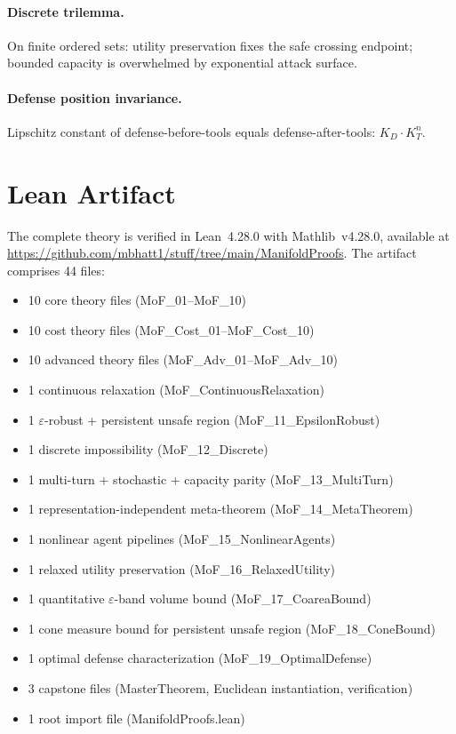 \documentclass[11pt]{article}
\begin{document}
\paragraph{Discrete trilemma.}
On finite ordered sets: utility preservation fixes the safe crossing
endpoint; bounded capacity is overwhelmed by exponential attack surface.

\paragraph{Defense position invariance.}
Lipschitz constant of defense-before-tools equals defense-after-tools:
$K_D \cdot K_T^n$.


\section{Lean Artifact}
\label{app:artifact}

The complete theory is verified in Lean~4.28.0 with Mathlib~v4.28.0,
available at
\url{https://github.com/mbhatt1/stuff/tree/main/ManifoldProofs}.
The artifact comprises 44 files:
\begin{itemize}[nosep]
  \item 10 core theory files (MoF\_01--MoF\_10)
  \item 10 cost theory files (MoF\_Cost\_01--MoF\_Cost\_10)
  \item 10 advanced theory files (MoF\_Adv\_01--MoF\_Adv\_10)
  \item 1 continuous relaxation (MoF\_ContinuousRelaxation)
  \item 1 $\varepsilon$-robust + persistent unsafe region
    (MoF\_11\_EpsilonRobust)
  \item 1 discrete impossibility (MoF\_12\_Discrete)
  \item 1 multi-turn + stochastic + capacity parity
    (MoF\_13\_MultiTurn)
  \item 1 representation-independent meta-theorem
    (MoF\_14\_MetaTheorem)
  \item 1 nonlinear agent pipelines (MoF\_15\_NonlinearAgents)
  \item 1 relaxed utility preservation (MoF\_16\_RelaxedUtility)
  \item 1 quantitative $\varepsilon$-band volume bound
    (MoF\_17\_CoareaBound)
  \item 1 cone measure bound for persistent unsafe region
    (MoF\_18\_ConeBound)
  \item 1 optimal defense characterization
    (MoF\_19\_OptimalDefense)
  \item 3 capstone files (MasterTheorem, Euclidean instantiation,
    verification)
  \item 1 root import file (ManifoldProofs.lean)
\end{itemize}
\end{document}
